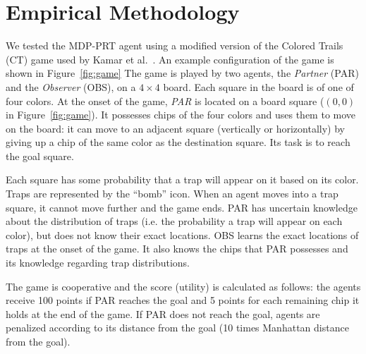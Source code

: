 \section{Empirical Methodology}
\label{sec:domain}
We tested the MDP-PRT agent using a modified version of the Colored Trails (CT) game used by Kamar et al.~.  An example configuration of the game is shown in Figure~\ref{fig:game}
The game is played by two agents, the \emph{Partner} (PAR) and the \emph{Observer} (OBS), on a $4\times 4$ board. Each square in the board is of one of four colors. At the onset of the game, \emph{PAR}  is located on a board square ($(0,0)$ in Figure~\ref{fig:game}). 
It possesses chips of the four colors and uses them to move on the board: it can move to an adjacent square (vertically or horizontally) by giving up a chip of the same color as the destination square. Its task is to reach the goal square. 

Each square has some probability that a trap will appear on it based on its color. Traps are represented by the ``bomb'' icon. When an agent moves into a trap square, it cannot move further and the game ends. PAR has uncertain knowledge about the distribution of traps (i.e. the probability a trap will appear on each color), but does not know their exact locations.  OBS learns the exact locations of traps at the onset of the game.  It also knows the chips that  PAR possesses and  its knowledge regarding trap distributions. 

The game is cooperative and the score (utility)  is calculated as follows: the agents receive 100 points if  PAR reaches the goal and 5 points for each remaining chip it holds at the end of the game. If PAR does not reach the goal, agents are penalized according to its distance from the goal (10 times Manhattan distance from the goal). 

